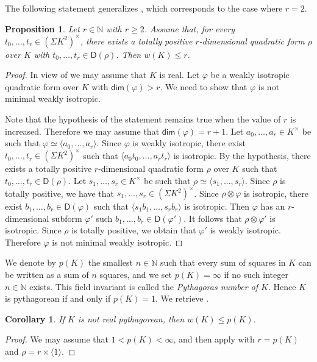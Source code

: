 \documentclass[twoside,11pt]{amsart}
\numberwithin{equation}{section}
\newtheorem{prop}[equation]{Proposition}
\newtheorem{cor}[equation]{Corollary}
\theoremstyle{definition}
\renewcommand{\dim}{\operatorname{\mathsf{dim}}}
\newcommand{\vf}{\varphi}
\newcommand{\mg}[1]{{#1}^{\times}}
\newcommand{\nat}{\mathbb{N}}
\newcommand{\la}{\langle}
\newcommand{\ra}{\rangle}
\renewcommand{\leq}{\leqslant}
\renewcommand{\geq}{\geqslant}
\renewcommand{\dim}{\mathsf{dim}}
\renewcommand{\leq}{\leqslant}
\renewcommand{\geq}{\geqslant}
\newcommand{\D}{\mathsf{D}}
\begin{document}
The following statement generalizes \cite[Satz~1, Folgerung]{AP77}, which corresponds to the case where $r=2$.

\begin{prop}\label{AP:B}
        Let $r\in\nat$ with $r\geq 2$. Assume that, for every $t_0,\dots,t_r\in\mg{(\mathsf{\Sigma}K^2)}$, there exists a totally positive $r$-dimensional quadratic form $\rho$ over $K$ with $t_0,\dots,t_r\in\D(\rho)$.
    Then $w(K)\leq r$.
\end{prop}
\begin{proof}
In view of  we may assume that $K$ is real.
Let $\vf$ be a weakly isotropic quadratic form over $K$ with $\dim(\vf)>r$. 
We need to show that $\vf$ is not minimal weakly isotropic.

Note that the hypothesis of the statement remains true when the value of $r$ is increased.
Therefore we may assume that $\dim(\vf)=r+1$.
Let $a_0,\dots,a_r\in\mg{K}$ be such that $\vf\simeq \la a_0,\dots,a_r\ra$.
Since $\vf$ is weakly isotropic, there exist $t_0,\dots,t_r\in\mg{(\mathsf{\Sigma}K^2)}$ such that $\la a_0t_0,\dots,a_rt_r\ra$ is isotropic.
By the hypothesis, there exists a totally positive $r$-dimensional quadratic form $\rho$ over $K$ such that $t_0,\dots,t_r\in\D(\rho)$.
Let $s_1,\dots,s_r\in\mg{K}$ be such that $\rho\simeq \la s_1,\dots,s_r\ra$.
Since $\rho$ is totally positive, we have that $s_1,\dots,s_r\in\mg{(\mathsf{\Sigma}K^2)}$.
Since $\rho\otimes\vf$ is isotropic, there exist $b_1,\dots,b_r\in\D(\vf)$ such that $\la s_1b_1,\dots,s_rb_r\ra$ is isotropic.
Then $\vf$ has an $r$-dimensional subform $\vf'$ such $b_1,\dots,b_r\in\D(\vf')$.
It follows that $\rho\otimes\vf'$ is isotropic.
Since $\rho$ is totally positive, we obtain that $\vf'$ is weakly isotropic.
Therefore $\vf$ is not minimal weakly isotropic.
\end{proof}

We denote by $p(K)$ the smallest $n\in\nat$ such that every sum of squares in $K$ can be written as a sum of $n$ squares, and we set $p(K)=\infty$ if no such integer $n\in\nat$ exists.
This field invariant is called the \emph{Pythagoras number of $K$}.
Hence $K$ is  pythagorean if and only if $p(K) = 1$.
We retrieve \cite[Theorem 3.3]{Bec06}. 

\begin{cor}\label{wp}
If $K$ is not real pythagorean, then $w(K)\leq p(K)$. 
\end{cor}
\begin{proof}
We may assume that $1<p(K)<\infty$, and then apply  with $r=p(K)$ and $\rho=r\times \la 1\ra$. 
\end{proof}
\end{document}
